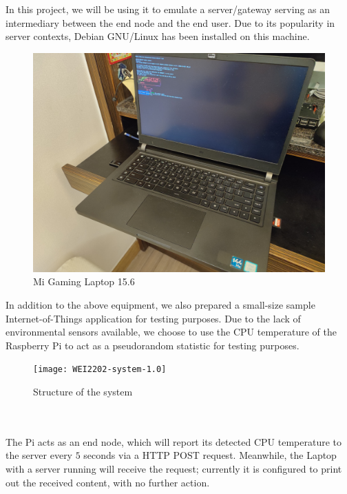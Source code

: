 \documentclass{article}
\begin{document}
\begin{multicols}{2}
\begin{itemize}
{In this project, we will be using it to emulate a server/gateway serving as an intermediary between the end node and the end user. Due to its popularity in server contexts, Debian GNU/Linux has been installed on this machine.\\
\begin{minipage}{0.4\textwidth}\begin{figure}[H]\includegraphics[width=\linewidth]{Laptop}
\caption{Mi Gaming Laptop 15.6}
\end{figure}\end{minipage}
}
\end{itemize}
In addition to the above equipment, we also prepared a small-size sample Internet-of-Things application for testing purposes.
Due to the lack of environmental sensors available, we choose to use the CPU temperature of the Raspberry Pi to act as a pseudorandom statistic for testing purposes.\\
\begin{minipage}{0.4\textwidth}\begin{figure}[H]\texttt{[image: WEI2202-system-1.0]}
\caption{Structure of the system}
\end{figure}\end{minipage}\\\\
The Pi acts as an end node, which will report its detected CPU temperature to the server every \(5\) seconds via a HTTP POST request. Meanwhile, the Laptop with a server running will receive the request; currently it is configured to print out the received content, with no further action.

\end{multicols}
\end{document}
